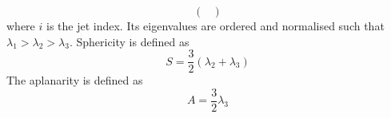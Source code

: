 \documentclass[12pt]{article}
\begin{document}
\begin{itemize}
\begin{equation}
\begin{pmatrix}
                   \end{pmatrix}
               \end{equation}
               where $i$ is the jet index. Its eigenvalues are ordered and normalised such that $\lambda_1  > \lambda_2 > \lambda_3$. Sphericity is deﬁned as
               \begin{equation}
                   S = \frac{3}{2} \left( \lambda_2 + \lambda_3 \right) 
               \end{equation}
               The aplanarity is defined as
               \begin{equation}
                   A = \frac{3}{2} \lambda_3
               \end{equation}
        \end{itemize}


		
\end{document}
